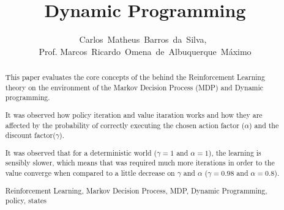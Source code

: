 \documentclass[journal,10pt,onecolumn,draftclsnofoot,]{IEEEtran}
\begin{document}
  \title{Dynamic Programming}
  \author{Carlos~Matheus~Barros~da~Silva,~
  \\Prof. Marcos~Ricardo~Omena~de~Albuquerque~Máximo}


\maketitle



\begin{abstract}

This paper evaluates the core concepts of the behind the Reinforcement Learning
theory on the environment of the Markov Decision Process (MDP) and Dynamic
programming.

It was observed how policy iteration and value itaration works and how they are
affected by the probability of correctly executing the chosen action factor
($\alpha$) and the discount factor($\gamma$).

It was observed that for a deterministic world ($\gamma = 1$ and $\alpha = 1$),
the learning is sensibly slower, which means that was required much more
iterations in order to the value converge when compared to a little decrease
on $\gamma$ and $\alpha$ ($\gamma = 0.98$ and $\alpha = 0.8$).

\begin{IEEEkeywords}
    Reinforcement Learning, Markov Decision Process, MDP, Dynamic Programming,  policy, states
\end{IEEEkeywords}
\end{abstract}

\IEEEpeerreviewmaketitle
\end{document}

